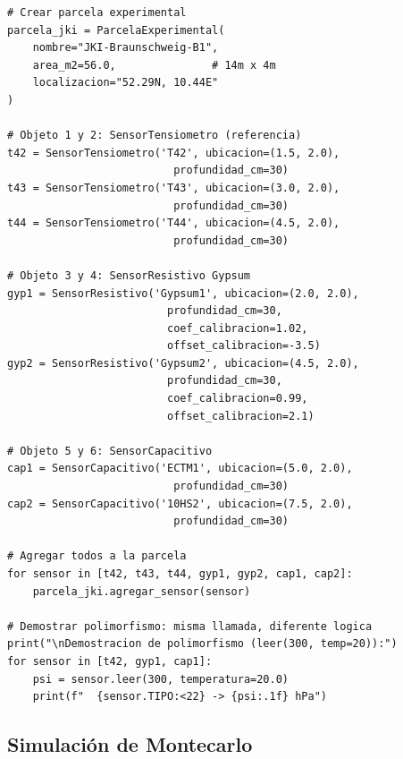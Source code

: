 \documentclass[12pt,a4paper]{article}
\begin{document}
\begin{lstlisting}[caption={Clase \texttt{ParcelaExperimental} y creación de objetos del sistema.}, label=lst:poo2]
# Crear parcela experimental
parcela_jki = ParcelaExperimental(
    nombre="JKI-Braunschweig-B1",
    area_m2=56.0,               # 14m x 4m
    localizacion="52.29N, 10.44E"
)

# Objeto 1 y 2: SensorTensiometro (referencia)
t42 = SensorTensiometro('T42', ubicacion=(1.5, 2.0), 
                          profundidad_cm=30)
t43 = SensorTensiometro('T43', ubicacion=(3.0, 2.0), 
                          profundidad_cm=30)
t44 = SensorTensiometro('T44', ubicacion=(4.5, 2.0), 
                          profundidad_cm=30)

# Objeto 3 y 4: SensorResistivo Gypsum
gyp1 = SensorResistivo('Gypsum1', ubicacion=(2.0, 2.0), 
                         profundidad_cm=30,
                         coef_calibracion=1.02,
                         offset_calibracion=-3.5)
gyp2 = SensorResistivo('Gypsum2', ubicacion=(4.5, 2.0), 
                         profundidad_cm=30,
                         coef_calibracion=0.99,
                         offset_calibracion=2.1)

# Objeto 5 y 6: SensorCapacitivo
cap1 = SensorCapacitivo('ECTM1', ubicacion=(5.0, 2.0), 
                          profundidad_cm=30)
cap2 = SensorCapacitivo('10HS2', ubicacion=(7.5, 2.0), 
                          profundidad_cm=30)

# Agregar todos a la parcela
for sensor in [t42, t43, t44, gyp1, gyp2, cap1, cap2]:
    parcela_jki.agregar_sensor(sensor)

# Demostrar polimorfismo: misma llamada, diferente logica
print("\nDemostracion de polimorfismo (leer(300, temp=20)):")
for sensor in [t42, gyp1, cap1]:
    psi = sensor.leer(300, temperatura=20.0)
    print(f"  {sensor.TIPO:<22} -> {psi:.1f} hPa")
\end{lstlisting}

\subsection{Simulación de Montecarlo}
\end{document}
